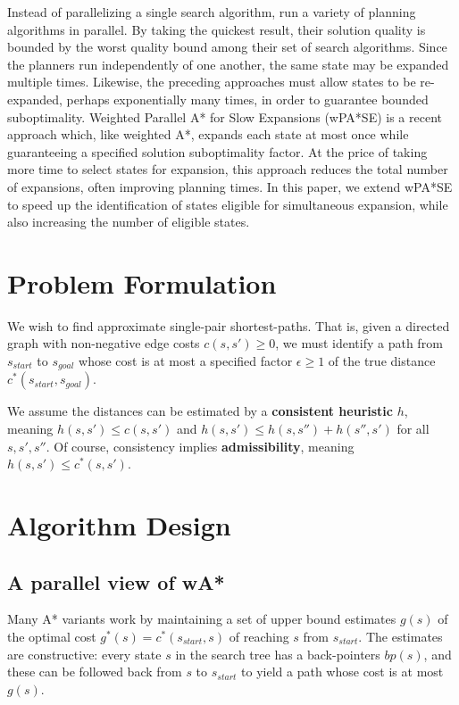 \documentclass[letterpaper]{article}
\begin{document}
Instead of parallelizing a single search algorithm, \cite{valenzano10} run a variety of planning algorithms in parallel.
By taking the quickest result, their solution quality is bounded by the worst quality bound among their set of search algorithms. Since the planners run independently of one another, the same state may be expanded multiple times.
Likewise, the preceding approaches must allow states to be re-expanded, perhaps exponentially many times, in order to guarantee bounded suboptimality. Weighted Parallel A* for Slow Expansions (wPA*SE) \cite{phillips2014pa}
is a recent approach which, like weighted A*, expands each state at most once
while guaranteeing a specified solution suboptimality factor. At the price of taking more time to select states for expansion, this approach reduces the total number of expansions, often improving planning times.
In this paper, we extend wPA*SE to speed up the identification of states eligible for simultaneous expansion, while also increasing the number of eligible states.

\section{Problem Formulation}

We wish to find approximate single-pair shortest-paths. That is, given a directed graph with non-negative edge costs $c(s,s') \ge 0$, we must identify a path from $s_{start}$ to $s_{goal}$ whose cost is at most a specified factor $\epsilon\ge 1$ of the true distance $c^*(s_{start},s_{goal})$.

We assume the distances can be estimated by a \textbf{consistent heuristic} $h$, meaning $h(s,s')\le c(s,s')$ and $h(s,s')\le h(s,s'') + h(s'',s')$ for all $s,s',s''$. Of course, consistency implies \textbf{admissibility}, meaning $h(s,s')\le c^*(s,s')$.

\section{Algorithm Design}

\subsection{A parallel view of wA*}

Many A* variants work by maintaining a set of upper bound estimates $g(s)$ of the optimal cost $g^*(s) = c^*(s_{start},s)$ of reaching $s$ from $s_{start}$. The estimates are constructive: every state $s$ in the search tree has a back-pointers $bp(s)$, and these can be followed back from $s$ to $s_{start}$ to yield a path whose cost is at most $g(s)$.
\end{document}
